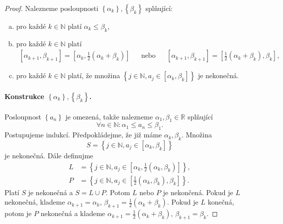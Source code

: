 \begin{proof}
	Nalezneme posloupnosti $\left \{ \alpha_k \right \}, \left \{ \beta_k \right \}  $ splňující:
	\begin{enumerate}[(a)]
		\item pro každé $k\in \mathbb N $ platí $\alpha_k \leq \beta_k$,
		\item pro každé $k \in \mathbb N $ platí
		\begin{align*}
		\left [ \alpha_{k+1}, \beta_{k+1} \right ] = \left [ \alpha_k, \frac{1}{2}\left( \alpha_k + \beta_k \right )  \right ]  && \text{nebo} && \left [ \alpha_{k+1}, \beta_{k+1} \right ] =\left [\frac{1}{2}\left( \alpha_k + \beta_k \right ), \beta_k  \right ],
		\end{align*}
		\item pro každé $k \in \mathbb N $ platí, že množina
		$\left \{ j\in \mathbb N ,a_j \in \left [ \alpha_k, \beta_k \right ]  \right \} $ je
		nekonečná.
	\end{enumerate}
	\paragraph{Konstrukce $\left \{ \alpha_k \right \}, \left \{ \beta_k \right \}  $.} Posloupnost
	$\left \{ a_n \right \} $ je omezená, takže nalezneme $\alpha_1, \beta_1 \in \mathbb R $ splňující
	$$
	    \forall n \in \mathbb N : \alpha_1 \leq a_n \leq \beta_1.
	$$
	Postupujeme indukcí. Předpokládejme, že již máme $\alpha_k, \beta_k$. Množina
	$$
	    S = \left \{ j \in \mathbb N , a_j \in \left [ \alpha_k, \beta_k \right ]  \right \}
	$$
	je nekonečná. Dále definujme
	\begin{align*}
		L &= \left \{ j\in \mathbb N , a_j \in \left [ \alpha_k, \frac{1}{2}\left( \alpha_k, \beta_k \right )  \right ]  \right \},  \\
		P &= \left \{ j \in \mathbb N , a_j \in \left [ \frac{1}{2}\left( \alpha_k, \beta_k \right ), \beta_k  \right ]  \right \}.
	\end{align*}
	Platí $S$ je nekonečná a $S = L\cup P.$ Potom $L$ nebo $P$ je nekončená.
	Pokud je $L$ nekonečná, klademe $\alpha_{k+1}=\alpha_k$, $\beta_{k+1}=\frac{1}{2}\left( \alpha_k + \beta_k \right ) $.
	Pokud je $L$ konečná, potom je $P$ nekonečná a klademe $\alpha_{k+1}=\frac{1}{2}\left( \alpha_k+\beta_k \right ) $,
	$\beta_{k+1}=\beta_k$.

\end{proof}

